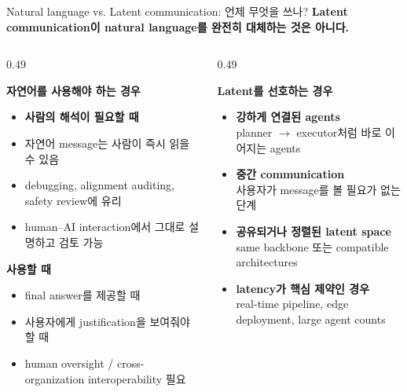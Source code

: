\documentclass[
11pt,notheorems,hyperref={pdfauthor=whatever}
]{beamer}
\begin{document}
\begin{frame}[t]{Natural language vs. Latent communication: 언제 무엇을 쓰나?}
\footnotesize
\textbf{Latent communication이 natural language를 완전히 대체하는 것은 아니다.}
\vspace{1.25em}

\begin{columns}[T,onlytextwidth]
\begin{column}{0.49\textwidth}

\vspace{0.3em}
\textbf{자연어를 사용해야 하는 경우}
\begin{itemize}
  \item \textbf{사람의 해석이 필요할 때}
  \item 자연어 message는 사람이 즉시 읽을 수 있음
  \item debugging, alignment auditing, safety review에 유리
  \item human--AI interaction에서 그대로 설명하고 검토 가능
\end{itemize}

\textbf{사용할 때}
\begin{itemize}
  \item final answer를 제공할 때
  \item 사용자에게 justification을 보여줘야 할 때
  \item human oversight / cross-organization interoperability 필요
\end{itemize}

\end{column}

\begin{column}{0.49\textwidth}

\vspace{0.3em}
\textbf{Latent를 선호하는 경우}
\begin{itemize}
  \item \textbf{강하게 연결된 agents}\\
  planner \(\rightarrow\) executor처럼 바로 이어지는 agents
  \item \textbf{중간 communication}\\
  사용자가 message를 볼 필요가 없는 단계
  \item \textbf{공유되거나 정렬된 latent space}\\
  same backbone 또는 compatible architectures
  \item \textbf{latency가 핵심 제약인 경우}\\
  real-time pipeline, edge deployment, large agent counts
\end{itemize}

\end{column}
\end{columns}

\end{frame}
\end{document}
